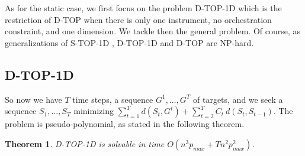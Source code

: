 \documentclass[a4paper]{book}
\newtheorem{theorem}{Theorem}[chapter]
\newcommand{\statoned}{{\sc S-TOP-1D }}
\newcommand{\dyn}{{\sc D-TOP }}
\newcommand{\dynoned}{{\sc D-TOP-1D }}
\begin{document}

As for the static case, we first focus on the problem \dynoned which is the restriction of \dyn when there is only one instrument, no orchestration constraint, and one dimension. We tackle then the general problem. Of course, as generalizations of \statoned, \dynoned and \dyn are NP-hard. 

\subsection{\dynoned}

So now we have $T$ time steps, a sequence $G^1,\dots,G^T$ of targets, and we seek a sequence $S_1,\dots,S_T$ minimizing
$ \sum \limits_{t=1}^T d(S_t,G^t) + \sum\limits_{t=2}^T C_t \   d(S_t,S_{t-1})$. The problem is pseudo-polynomial, as stated in the following theorem. 

\begin{theorem}\label{th:dyn1dnoc}
\dynoned is solvable in time $O(n^3p_{max}+Tn^2p_{max}^2)$.
\end{theorem}
\end{document}
